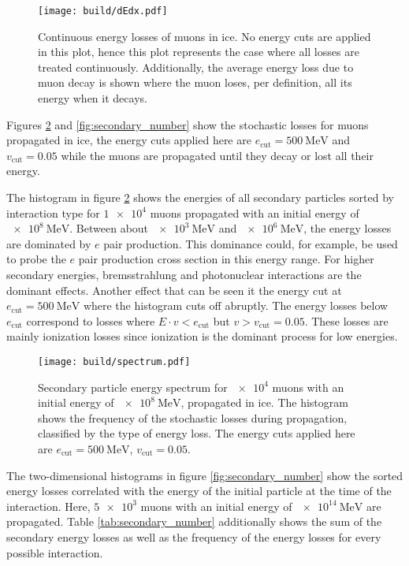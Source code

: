 \begin{figure}
    \centering
    \texttt{[image: build/dEdx.pdf]}
    \caption{Continuous energy losses of muons in ice. No energy cuts are applied in this plot, hence this plot represents the case where all losses are treated continuously. Additionally, the average energy loss due to muon decay is shown where the muon loses, per definition, all its energy when it decays. }
    \label{fig:dEdx}
\end{figure}

Figures \ref{fig:spectrum} and \ref{fig:secondary_number} show the stochastic losses for muons propagated in ice, the energy cuts applied here are $e_\text{cut} = \SI{500}{\mega\electronvolt}$ and $v_\text{cut} = \num{0.05}$ while the muons are propagated until they decay or lost all their energy.

The histogram in figure \ref{fig:spectrum} shows the energies of all secondary particles sorted by interaction type for $\num{1e4}$ muons propagated with an initial energy of $\SI{e8}{\mega\electronvolt}$.
Between about $\SI{e3}{\mega\electronvolt}$ and $\SI{e6}{\mega\electronvolt}$, the energy losses are dominated by $e$ pair production.
This dominance could, for example, be used to probe the $e$ pair production cross section in this energy range.
For higher secondary energies, bremsstrahlung and photonuclear interactions are the dominant effects.
Another effect that can be seen it the energy cut at $e_\text{cut} = \SI{500}{\mega\electronvolt}$ where the histogram cuts off abruptly.
The energy losses below $e_\text{cut}$ correspond to losses where $E \cdot v < e_\text{cut}$ but $v > v_\text{cut} = 0.05$.
These losses are mainly ionization losses since ionization is the dominant process for low energies.

\begin{figure}
    \centering
    \texttt{[image: build/spectrum.pdf]}
    \caption{Secondary particle energy spectrum for $\num{e4}$ muons with an initial energy of $\SI{e8}{\mega\electronvolt}$, propagated in ice. The histogram shows the frequency of the stochastic losses during propagation, classified by the type of energy loss. The energy cuts applied here are $e_\text{cut} = \SI{500}{\mega\electronvolt}$, $v_\text{cut} = 0.05$.}
    \label{fig:spectrum}
\end{figure}

The two-dimensional histograms in figure \ref{fig:secondary_number} show the sorted energy losses correlated with the energy of the initial particle at the time of the interaction.
Here, $\num{5e3}$ muons with an initial energy of $\SI{e14}{\mega\electronvolt}$ are propagated.
Table \ref{tab:secondary_number} additionally shows the sum of the secondary energy losses as well as the frequency of the energy losses for every possible interaction.

